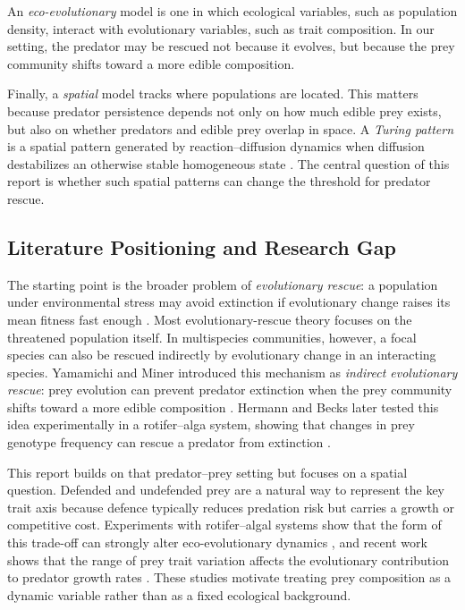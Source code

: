 \documentclass[12pt,letterpaper]{article}
\numberwithin{equation}{section}
\begin{document}
An \emph{eco-evolutionary} model is one in which ecological variables, such as
population density, interact with evolutionary variables, such as trait composition.
In our setting, the predator may be rescued not because it evolves, but because the prey
community shifts toward a more edible composition.

Finally, a \emph{spatial} model tracks where populations are located. This matters
because predator persistence depends not only on how much edible prey exists, but also
on whether predators and edible prey overlap in space. A \emph{Turing pattern} is a
spatial pattern generated by reaction--diffusion dynamics when diffusion destabilizes
an otherwise stable homogeneous state \cite{turing1952}. The central question of this
report is whether such spatial patterns can change the threshold for predator rescue.

\subsection{Literature Positioning and Research Gap}

The starting point is the broader problem of \emph{evolutionary rescue}: a population
under environmental stress may avoid extinction if evolutionary change raises its mean
fitness fast enough \cite{gomulkiewicz1995}. Most evolutionary-rescue theory focuses
on the threatened population itself. In multispecies communities, however, a focal
species can also be rescued indirectly by evolutionary change in an interacting species.
Yamamichi and Miner introduced this mechanism as \emph{indirect evolutionary rescue}:
prey evolution can prevent predator extinction when the prey community shifts toward a
more edible composition \cite{yamamichi2015}. Hermann and Becks later tested this idea
experimentally in a rotifer--alga system, showing that changes in prey genotype
frequency can rescue a predator from extinction \cite{hermann2022}.

This report builds on that predator--prey setting but focuses on a spatial question.
Defended and undefended prey are a natural way to represent the key trait axis because
defence typically reduces predation risk but carries a growth or competitive cost.
Experiments with rotifer--algal systems show that the form of this trade-off can
strongly alter eco-evolutionary dynamics \cite{kasada2014}, and recent work shows that
the range of prey trait variation affects the evolutionary contribution to predator
growth rates \cite{hermann2024}. These studies motivate treating prey composition as a
dynamic variable rather than as a fixed ecological background.
\end{document}

